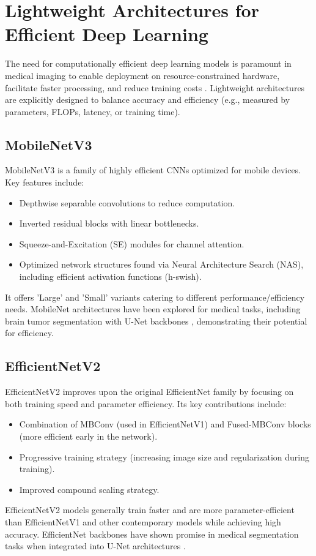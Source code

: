 \section{Lightweight Architectures for Efficient Deep Learning}

The need for computationally efficient deep learning models is paramount in medical imaging to enable deployment on resource-constrained hardware, facilitate faster processing, and reduce training costs \parencite{canziani2016analysis, hirschorn2014use, ullah2023enhancing}. Lightweight architectures are explicitly designed to balance accuracy and efficiency (e.g., measured by parameters, FLOPs, latency, or training time).

\subsection{MobileNetV3}
MobileNetV3 \parencite{howard2019searching} is a family of highly efficient CNNs optimized for mobile devices. Key features include:
\begin{itemize}
  \item Depthwise separable convolutions to reduce computation.
  \item Inverted residual blocks with linear bottlenecks.
  \item Squeeze-and-Excitation (SE) modules for channel attention.
  \item Optimized network structures found via Neural Architecture Search (NAS), including efficient activation functions (h-swish).
\end{itemize}
It offers 'Large' and 'Small' variants catering to different performance/efficiency needs. MobileNet architectures have been explored for medical tasks, including brain tumor segmentation with U-Net backbones \parencite{pavithra2023mobilenetv2}, demonstrating their potential for efficiency.

\subsection{EfficientNetV2}
EfficientNetV2 \parencite{tan2021efficientnetv2} improves upon the original EfficientNet family by focusing on both training speed and parameter efficiency. Its key contributions include:
\begin{itemize}
  \item Combination of MBConv (used in EfficientNetV1) and Fused-MBConv blocks (more efficient early in the network).
  \item Progressive training strategy (increasing image size and regularization during training).
  \item Improved compound scaling strategy.
\end{itemize}
EfficientNetV2 models generally train faster and are more parameter-efficient than EfficientNetV1 and other contemporary models while achieving high accuracy. EfficientNet backbones have shown promise in medical segmentation tasks when integrated into U-Net architectures \parencite{lin2024brain}.

